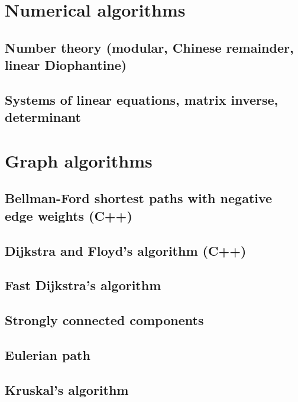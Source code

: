 \section{Numerical algorithms}
\subsection{Number theory (modular, Chinese remainder, linear Diophantine)}
\raggedbottom
\hrulefill
\subsection{Systems of linear equations, matrix inverse, determinant}
\raggedbottom
\hrulefill

\section{Graph algorithms}
\subsection{Bellman-Ford shortest paths with negative edge weights (C++)}
\raggedbottom
\hrulefill
\subsection{Dijkstra and Floyd's algorithm (C++)}
\raggedbottom
\hrulefill
\subsection{Fast Dijkstra's algorithm}
\raggedbottom
\hrulefill
\subsection{Strongly connected components}
\raggedbottom
\hrulefill
\subsection{Eulerian path}
\raggedbottom
\hrulefill
\subsection{Kruskal's algorithm}
\raggedbottom
\hrulefill

